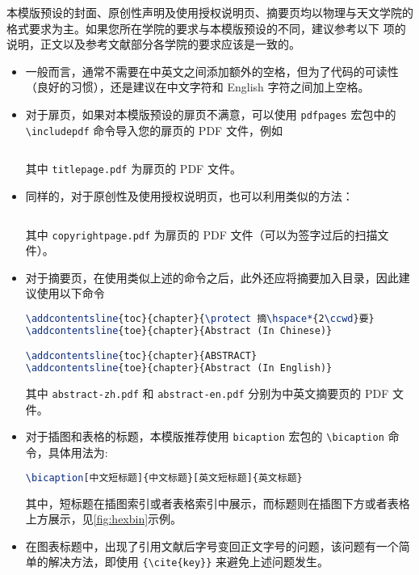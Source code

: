 本模版预设的封面、原创性声明及使用授权说明页、摘要页均以物理与天文学院的格式要求为主。如果您所在学院的要求与本模版预设的不同，建议参考以下 \textdagger 项的说明，正文以及参考文献部分各学院的要求应该是一致的。
\begin{itemize}
    \item 一般而言，通常不需要在中英文之间添加额外的空格，但为了代码的可读性（良好的习惯），还是建议在中文字符和 English 字符之间加上空格。
    \item[\textdagger] 对于扉页，如果对本模版预设的扉页不满意，可以使用 \texttt{pdfpages} 宏包中的 \texttt{\textbackslash includepdf} 命令导入您的扉页的 PDF 文件，例如
\begin{lstlisting}[language=TeX]
% \maketitle

\end{lstlisting}
    其中 \texttt{titlepage.pdf} 为扉页的 PDF 文件。
    \item[\textdagger] 同样的，对于原创性及使用授权说明页，也可以利用类似的方法：
\begin{lstlisting}[language=TeX]
% \makecopyright

\end{lstlisting}
    其中 \texttt{copyrightpage.pdf} 为扉页的 PDF 文件（可以为签字过后的扫描文件）。
    \item[\textdagger] 对于摘要页，在使用类似上述的命令之后，此外还应将摘要加入目录，因此建议使用以下命令
\begin{lstlisting}[language=TeX]
% 
\addcontentsline{toc}{chapter}{\protect 摘\hspace*{2\ccwd}要}
\addcontentsline{toe}{chapter}{Abstract (In Chinese)}

\addcontentsline{toc}{chapter}{ABSTRACT}
\addcontentsline{toe}{chapter}{Abstract (In English)}

\end{lstlisting}
    其中 \texttt{abstract-zh.pdf} 和 \texttt{abstract-en.pdf} 分别为中英文摘要页的 PDF 文件。
    \item 对于插图和表格的标题，本模版推荐使用 \texttt{bicaption} 宏包的 \texttt{\textbackslash bicaption} 命令，具体用法为:
\begin{lstlisting}[language=TeX]
\bicaption[中文短标题]{中文标题}[英文短标题]{英文标题}
\end{lstlisting}
    其中，短标题在插图索引或者表格索引中展示，而标题则在插图下方或者表格上方展示，见\ref{fig:hexbin}示例。
    \item 在图表标题中，出现了引用文献后字号变回正文字号的问题，该问题有一个简单的解决方法，即使用 \texttt{\{\textbackslash cite\{key\}\}} 来避免上述问题发生。
\end{itemize}

